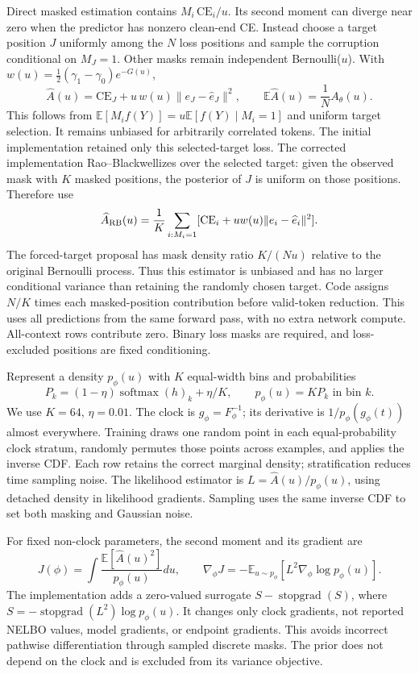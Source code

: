 \documentclass[11pt]{article}
\newcommand{\E}{\mathbb E}
\begin{document}
Direct masked estimation contains $M_i\,\mathrm{CE}_i/u$. Its second moment
can diverge near zero when the predictor has nonzero clean-end CE. Instead
choose a target position $J$ uniformly among the $N$ loss positions and
sample the corruption conditional on $M_J=1$. Other masks remain independent
Bernoulli($u$). With $w(u)=\tfrac12(\gamma_1-\gamma_0)e^{-G(u)}$,
\[
 \widehat A(u)=\mathrm{CE}_J+u\,w(u)\|e_J-\widehat e_J\|^2,
 \qquad \E\widehat A(u)=\frac1N A_\theta(u).
\]
This follows from $\E[M_i f(Y)]=u\E[f(Y)\mid M_i=1]$ and uniform target
selection. It remains unbiased for arbitrarily correlated tokens. The initial implementation retained only this selected-target loss. The
corrected implementation Rao--Blackwellizes over the selected target:
given the observed mask with $K$ masked positions, the posterior of $J$
is uniform on those positions. Therefore use
\[
 \widehat A_{\rm RB}(u)=\frac1K\sum_{i:M_i=1}
 [\mathrm{CE}_i+u w(u)\|e_i-\widehat e_i\|^2].
\]
The forced-target proposal has mask density ratio $K/(Nu)$ relative to the
original Bernoulli process. Thus this estimator is unbiased and has no larger
conditional variance than retaining the randomly chosen target. Code assigns
$N/K$ times each masked-position contribution before valid-token reduction.
This uses all predictions from the same forward pass, with no extra network
compute. All-context rows contribute zero. Binary loss
masks are required, and loss-excluded positions are fixed conditioning.

Represent a density $p_\phi(u)$ with $K$ equal-width bins and probabilities
\[
 P_k=(1-\eta)\operatorname{softmax}(h)_k+\eta/K,
 \qquad p_\phi(u)=KP_k \text{ in bin }k.
\]
We use $K=64$, $\eta=0.01$. The clock is $g_\phi=F_\phi^{-1}$; its derivative
is $1/p_\phi(g_\phi(t))$ almost everywhere. Training draws one random point in each equal-probability clock stratum,
randomly permutes those points across examples, and applies the inverse CDF.
Each row retains the correct marginal density; stratification reduces time
sampling noise. The likelihood estimator is
$L=\widehat A(u)/p_\phi(u)$, using detached density in likelihood gradients.
Sampling uses the same inverse CDF to set both masking and Gaussian noise.

For fixed non-clock parameters, the second moment and its gradient are
\[
 J(\phi)=\int\frac{\E[\widehat A(u)^2]}{p_\phi(u)}du,
 \qquad
 \nabla_\phi J=-\E_{u\sim p_\phi}
 [L^2\nabla_\phi\log p_\phi(u)].
\]
The implementation adds a zero-valued surrogate
$S-\operatorname{stopgrad}(S)$, where
$S=-\operatorname{stopgrad}(L^2)\log p_\phi(u)$.
It changes only clock gradients, not reported NELBO values, model gradients,
or endpoint gradients. This avoids incorrect pathwise differentiation
through sampled discrete masks. The prior does not depend on the clock and
is excluded from its variance objective.
\end{document}
